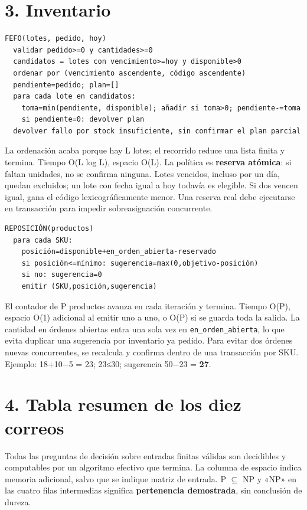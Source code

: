 \documentclass[12pt,a4paper]{article}
\begin{document}
\section{3. Inventario}

\begin{verbatim}
FEFO(lotes, pedido, hoy)
  validar pedido>=0 y cantidades>=0
  candidatos = lotes con vencimiento>=hoy y disponible>0
  ordenar por (vencimiento ascendente, código ascendente)
  pendiente=pedido; plan=[]
  para cada lote en candidatos:
    toma=min(pendiente, disponible); añadir si toma>0; pendiente-=toma
    si pendiente=0: devolver plan
  devolver fallo por stock insuficiente, sin confirmar el plan parcial
\end{verbatim}

La ordenación acaba porque hay L lotes; el recorrido reduce una lista finita y termina. Tiempo O(L log L), espacio O(L). La política es \textbf{reserva atómica}: si faltan unidades, no se confirma ninguna. Lotes vencidos, incluso por un día, quedan excluidos; un lote con fecha igual a hoy todavía es elegible. Si dos vencen igual, gana el código lexicográficamente menor. Una reserva real debe ejecutarse en transacción para impedir sobreasignación concurrente.


\begin{verbatim}
REPOSICIÓN(productos)
  para cada SKU:
    posición=disponible+en_orden_abierta-reservado
    si posición<=mínimo: sugerencia=max(0,objetivo-posición)
    si no: sugerencia=0
    emitir (SKU,posición,sugerencia)
\end{verbatim}

El contador de P productos avanza en cada iteración y termina. Tiempo O(P), espacio O(1) adicional al emitir uno a uno, o O(P) si se guarda toda la salida. La cantidad en órdenes abiertas entra una sola vez en \texttt{en\_orden\_abierta}, lo que evita duplicar una sugerencia por inventario ya pedido. Para evitar dos órdenes nuevas concurrentes, se recalcula y confirma dentro de una transacción por SKU. Ejemplo: 18+10−5 = 23; 23≤30; sugerencia 50−23 = \textbf{27}.


\section{4. Tabla resumen de los diez correos}

Todas las preguntas de decisión sobre entradas finitas válidas son decidibles y computables por un algoritmo efectivo que termina. La columna de espacio indica memoria adicional, salvo que se indique matriz de entrada. P $\subseteq$ NP y «NP» en las cuatro filas intermedias significa \textbf{pertenencia demostrada}, sin conclusión de dureza.
\end{document}
